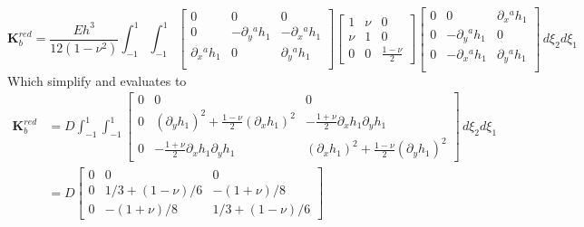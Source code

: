 \documentclass[12pt]{article}
\begin{document}
$$\mathbf K^{red}_b=\frac{Eh^3}{12(1 - \nu^2)}\int_{-1}^1\int_{-1}^1 \begin{bmatrix}
        0                  & 0                   & 0                   \\
        0                  & -\partial_y{}^a h_1 & -\partial_x{}^a h_1 \\
        \partial_x{}^a h_1 & 0                   & \partial_y{}^a h_1  \\
    \end{bmatrix}\begin{bmatrix}
        1   & \nu & 0                 \\
        \nu & 1   & 0                 \\
        0   & 0   & \frac{1 - \nu}{2}
    \end{bmatrix}\begin{bmatrix}
        0 & 0                   & \partial_x{}^a h_1 \\
        0 & -\partial_y{}^a h_1 & 0                  \\
        0 & -\partial_x{}^a h_1 & \partial_y{}^a h_1 \\
    \end{bmatrix}\, d\xi_2d\xi_1 $$
Which simplify and evaluates to
\begin{align*}
    \mathbf K^{red}_b & =D\int_{-1}^1\int_{-1}^1 \begin{bmatrix}
                                                     0 & 0                                                        & 0                                                        \\[5pt]
                                                     0 & (\partial_y h_1)^2 + \frac{1 - \nu}{2}(\partial_x h_1)^2 & -\frac{1 + \nu}{2}\partial_x h_1 \partial_y h_1          \\[5pt]
                                                     0 & -\frac{1 + \nu}{2}\partial_x h_1 \partial_y h_1          & (\partial_x h_1)^2 + \frac{1 - \nu}{2}(\partial_y h_1)^2
                                                 \end{bmatrix}\, d\xi_2d\xi_1 \\
                      & =D\begin{bmatrix}
                              0 & 0                 & 0                 \\
                              0 & 1/3 + (1 - \nu)/6 & -(1 + \nu)/8      \\
                              0 & -(1 + \nu)/8      & 1/3 + (1 - \nu)/6
                          \end{bmatrix}
\end{align*}
\end{document}
